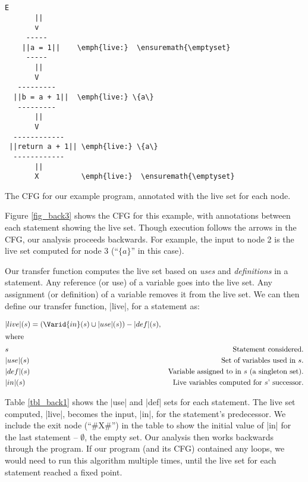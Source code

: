 \documentclass[12pt]{report}
\begin{document}
\begin{myfig}[th]
\begin{minipage}{2in}
\begin{Verbatim}[commandchars=\\\{\}]
       E
       ||      
       v
     -----
    ||a = 1||    \emph{live:}  \ensuremath{\emptyset}
     -----
       ||      
       V
   ---------
  ||b = a + 1||  \emph{live:} \{a\}  
   ---------
       ||      
       V
  ------------
 ||return a + 1|| \emph{live:} \{a\}
  ------------
       ||      
       X          \emph{live:}  \ensuremath{\emptyset}
\end{Verbatim}
\end{minipage}
\caption{The CFG for our example program, annotated with the live
set for each node.}
\label{fig_back3}
\end{myfig}

Figure \ref{fig_back3} shows the CFG for this example, with annotations
between each statement showing the live set. Though
execution follows the arrows in the CFG, our analysis proceeds
backwards. For example, the input to node 2 is the live set computed
for node 3 (``$\{a\}$'' in this case).

Our transfer function computes the live set based on \emph{uses} and
\emph{definitions} in a statement. Any reference (or use) of a
variable goes into the live set. Any assignment (or definition) of a
variable removes it from the live set. We can then define our transfer
function, |live|, for a statement as:

\begin{align}
  & |live|(s) = (\Varid{in}(s) \cup |use|(s)) - |def|(s), \label{eqn_back1} \\
\intertext{where}
  & s     & \text{Statement considered.} \notag\\
  & |use|(s) &  \text{Set of variables used in $s$}. \notag\\
  & |def|(s) & \text{Variable assigned to in $s$ (a singleton set)}. \notag\\
  & |in|(s) & \text{Live variables computed for $s$' successor}. \notag
\end{align}

Table \ref{tbl_back1} shows the |use| and |def| sets for each
statement. The live set computed, |live|, becomes the input, |in|, for
the statement's predecessor. We include the exit node (``#X#'') in the
table to show the initial value of |in| for the last statement --
$\emptyset$, the empty set. Our analysis then works backwards through the
program. If our program (and its CFG) contained any loops, we would
need to run this algorithm multiple times, until the live set for each
statement reached a fixed point.
\end{document}
